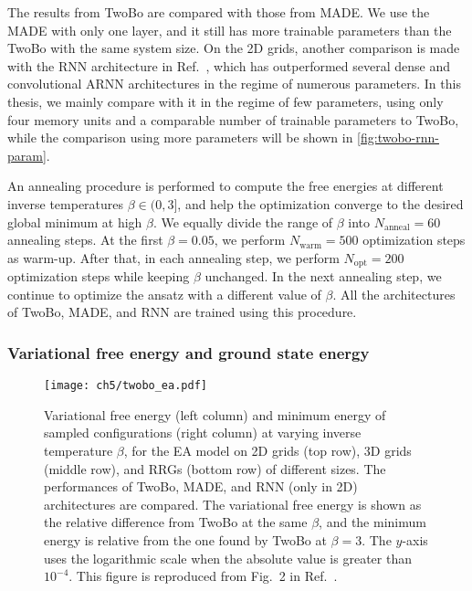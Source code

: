 The results from TwoBo are compared with those from MADE. We use the MADE with only one layer, and it still has more trainable parameters than the TwoBo with the same system size. On the 2D grids, another comparison is made with the RNN architecture in Ref.~\cite{hibat2021variational}, which has outperformed several dense and convolutional ARNN architectures in the regime of numerous parameters. In this thesis, we mainly compare with it in the regime of few parameters, using only four memory units and a comparable number of trainable parameters to TwoBo, while the comparison using more parameters will be shown in \cref{fig:twobo-rnn-param}.

An annealing procedure is performed to compute the free energies at different inverse temperatures $\beta \in (0, 3]$, and help the optimization converge to the desired global minimum at high $\beta$. We equally divide the range of $\beta$ into $N_\text{anneal} = 60$ annealing steps. At the first $\beta = 0.05$, we perform $N_\text{warm} = 500$ optimization steps as warm-up. After that, in each annealing step, we perform $N_\text{opt} = 200$ optimization steps while keeping $\beta$ unchanged. In the next annealing step, we continue to optimize the ansatz with a different value of $\beta$. All the architectures of TwoBo, MADE, and RNN are trained using this procedure.

\subsubsection{Variational free energy and ground state energy}

\begin{figure}[htb]
\centering
\texttt{[image: ch5/twobo\_ea.pdf]}
\caption[TwoBo results of Edwards--Anderson (EA) model]{
Variational free energy (left column) and minimum energy of sampled configurations (right column) at varying inverse temperature $\beta$, for the EA model on 2D grids (top row), 3D grids (middle row), and RRGs (bottom row) of different sizes.
The performances of TwoBo, MADE, and RNN (only in 2D) architectures are compared.
The variational free energy is shown as the relative difference from TwoBo at the same $\beta$, and the minimum energy is relative from the one found by TwoBo at $\beta = 3$.
The $y$-axis uses the logarithmic scale when the absolute value is greater than $10^{-4}$.
This figure is reproduced from Fig.~2 in Ref.~\cite{biazzo2024sparse}.
}
\label{fig:twobo-ea}
\end{figure}

